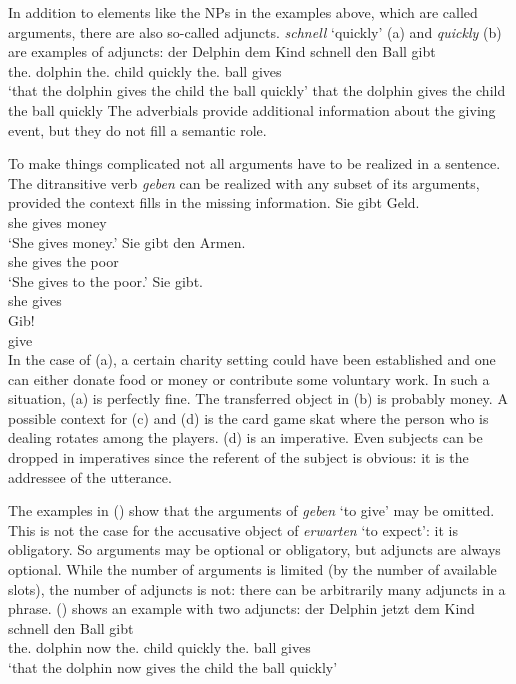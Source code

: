 In addition to elements like the NPs in the examples above, which are called arguments,
there are also so-called adjuncts. \emph{schnell} `quickly' (a) and \emph{quickly} (b)
are examples of adjuncts:
\eal
\ex
\gll \dass{} der        Delphin dem        Kind  schnell den        Ball gibt\\
     \that{} the.\NOM{} dolphin the.\DAT{} child quickly the.\ACC{} ball gives\\
\glt `that the dolphin gives the child the ball quickly'
\ex that the dolphin gives the child the ball quickly
\zl
The adverbials provide additional information about the giving event, but they do not fill a
semantic role.

To make things complicated not all arguments have to be realized in a sentence. The ditransitive verb \emph{geben} can be
realized with any subset of its arguments, provided the context fills in the missing information.
\eal
\ex 
\gll Sie gibt Geld.\\
     she gives money\\
\glt `She gives money.'
\ex 
\gll Sie gibt den Armen.\\
     she gives the poor\\
\glt `She gives to the poor.'
\ex\label{ex-sie-gibt} 
\gll Sie gibt.\\
     she gives\\
\ex 
\gll Gib!\\
     give\\
\zl
In the case of (a), a certain charity setting could have been established and one can either
donate food or money or contribute some voluntary work. In such a situation, (a) is perfectly
fine. The transferred object in (b) is probably money. A possible context for (c) and
(d) is the card game skat where the person who is dealing rotates among the
players. (d) is an imperative. Even subjects can be dropped in imperatives since the referent
of the subject is obvious: it is the addressee of the utterance. 

The examples in () show that the arguments of \emph{geben} `to give' may be omitted. This is
not the case for the accusative object of \emph{erwarten} `to expect': it is obligatory. So
arguments may be optional or obligatory, but adjuncts are always optional. While the number of
arguments is limited (by the number of available slots), the number of adjuncts is not: there can be
arbitrarily many adjuncts in a phrase. () shows an example with two adjuncts:
\ea
\gll \dass{} der        Delphin jetzt dem        Kind  schnell den        Ball gibt\\
     \that{} the.\NOM{} dolphin now   the.\DAT{} child quickly the.\ACC{} ball gives\\
\glt `that the dolphin now gives the child the ball quickly'
\z

